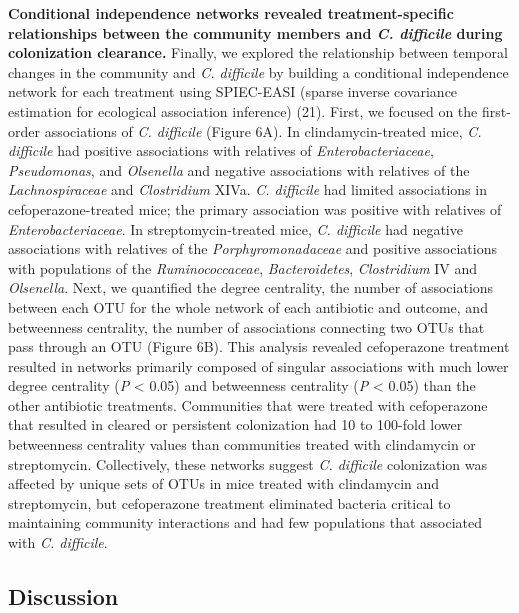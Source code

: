 \documentclass[12pt,]{article}
\begin{document}
\textbf{Conditional independence networks revealed treatment-specific
relationships between the community members and \emph{C. difficile}
during colonization clearance.} Finally, we explored the relationship
between temporal changes in the community and \emph{C. difficile} by
building a conditional independence network for each treatment using
SPIEC-EASI (sparse inverse covariance estimation for ecological
association inference) (21). First, we focused on the first-order
associations of \emph{C. difficile} (Figure 6A). In clindamycin-treated
mice, \emph{C. difficile} had positive associations with relatives of
\emph{Enterobacteriaceae}, \emph{Pseudomonas}, and \emph{Olsenella} and
negative associations with relatives of the \emph{Lachnospiraceae} and
\emph{Clostridium} XIVa. \emph{C. difficile} had limited associations in
cefoperazone-treated mice; the primary association was positive with
relatives of \emph{Enterobacteriaceae}. In streptomycin-treated mice,
\emph{C. difficile} had negative associations with relatives of the
\emph{Porphyromonadaceae} and positive associations with populations of
the \emph{Ruminococcaceae}, \emph{Bacteroidetes}, \emph{Clostridium} IV
and \emph{Olsenella}. Next, we quantified the degree centrality, the
number of associations between each OTU for the whole network of each
antibiotic and outcome, and betweenness centrality, the number of
associations connecting two OTUs that pass through an OTU (Figure 6B).
This analysis revealed cefoperazone treatment resulted in networks
primarily composed of singular associations with much lower degree
centrality (\emph{P} \textless{} 0.05) and betweenness centrality
(\emph{P} \textless{} 0.05) than the other antibiotic treatments.
Communities that were treated with cefoperazone that resulted in cleared
or persistent colonization had 10 to 100-fold lower betweenness
centrality values than communities treated with clindamycin or
streptomycin. Collectively, these networks suggest \emph{C. difficile}
colonization was affected by unique sets of OTUs in mice treated with
clindamycin and streptomycin, but cefoperazone treatment eliminated
bacteria critical to maintaining community interactions and had few
populations that associated with \emph{C. difficile}.

\hypertarget{discussion}{%
\subsection{Discussion}\label{discussion}}
\end{document}
